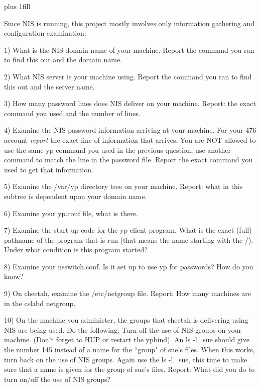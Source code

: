 
\rightskip=0pt plus 1fill

\parindent 0pt

Since NIS is running, this project mostly involves only
information gathering and configuration examination:

1) What is the NIS domain name of your machine.
Report the command you ran to find this out and the domain name.

2) What NIS server is your machine using.
Report the command you ran to find this out and the server name.

3) How many password lines does NIS deliver on your machine.
Report: the exact command you used and the number of lines.

4) Examine the NIS password information arriving at your machine.
For your 476 account {\it report} the exact line of 
information that arrives.
You are NOT allowed to use the same yp command you used in the previous
question, use another command to match the line in the password file.
Report the exact command you used to get that information.

5) Examine the {\ltt{}/var/yp} directory tree on your machine.
Report: what in this subtree is dependent upon your domain name.

6) Examine your {\ltt{}yp.conf} file, what is there.

7) Examine the start-up code for the yp client program.
What is the exact (full) pathname of the program that is run
(that means the name starting with the {\ltt{}/}).
Under what condition is this program started?

8) Examine your {\ltt{}nsswitch.conf}.
Is it set up to use yp for passwords?
How do you know?

9)  On cheetah, examine the {\ltt{}/etc/netgroup} file.
Report: How many machines are in the {\ltt{}cslabd} netgroup.

10) On the machine you administer, the groups that {\ltt{}cheetah} is
delivering using NIS are being used. 
Do the following.
Turn off the use of NIS groups on your machine.
(Don't forget to HUP or restart the {\ltt{}ypbind}).
An {\ltt{}ls -l ~sue} should give the number 145
instead of a name for the ``group" of sue's files.
When this works, turn back on the use of NIS groups.
Again use the {\ltt{}ls -l ~sue}, this time to make sure
that a name is given for the group of sue's files.
Report: What did you do to turn on/off the use of NIS groups?
\bye

